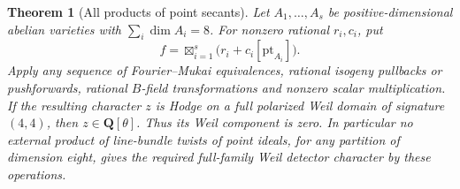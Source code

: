 \documentclass[11pt]{article}
\newtheorem{theorem}{Theorem}[section]
\theoremstyle{definition}
\theoremstyle{remark}
\newcommand{\Q}{\mathbf Q}
\begin{document}
\begin{theorem}[All products of point secants]\label{thm:all-point-products}
Let $A_1,\ldots,A_s$ be positive-dimensional abelian varieties with
$\sum_i\dim A_i=8$. For nonzero rational $r_i,c_i$, put
\[
 f=\boxtimes_{i=1}^s\bigl(r_i+c_i[\mathrm{pt}_{A_i}]\bigr).
\]
Apply any sequence of Fourier--Mukai equivalences, rational isogeny
pullbacks or pushforwards, rational $B$-field transformations and
nonzero scalar multiplication. If the resulting character $z$ is
Hodge on a full polarized Weil domain of signature $(4,4)$, then
$z\in\Q[\theta]$. Thus its Weil component is zero.
In particular no external product of line-bundle twists of point
ideals, for any partition of dimension eight, gives the required
full-family Weil detector character by these operations.
\end{theorem}
\end{document}
